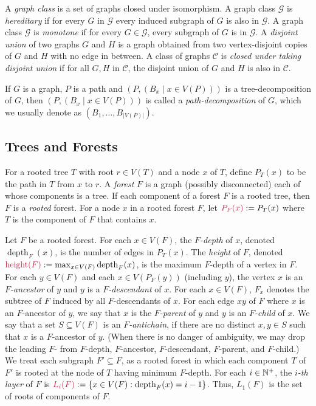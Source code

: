 \documentclass{patmorin}
\makeatletter
\newcommand{\defin}[1]{\emph{\textcolor{brightmaroon}{#1}}}
\def\mathcolor#1#{\@mathcolor{#1}}
\def\@mathcolor#1#2#3{%
  \protect\leavevmode
  \begingroup
    \color#1{#2}#3%
  \endgroup
}
\newcommand{\mathdefin}[1]{\mathcolor{brightmaroon}{#1}}
\DeclareMathOperator{\height}{height}
\DeclareMathOperator{\depth}{depth}
\makeatother
\begin{document}
A \defin{graph class} is a set of graphs closed under isomorphism. A graph class  $\mathcal{G}$ is \defin{hereditary} if for every $G$ in $\mathcal{G}$ every induced subgraph of $G$ is also in $\mathcal{G}$. A  graph class $\mathcal{G}$ is \defin{monotone} if for every $G\in\mathcal{G}$, every subgraph of $G$ is in $\mathcal{G}$. 
 A \defin{disjoint union} of two graphs $G$ and $H$ is a graph obtained from two vertex-disjoint copies of $G$ and $H$ with no edge in between. A class of graphs $\mathcal{C}$ is \defin{closed under taking disjoint union} if for all $G,H$ in $\mathcal{C}$, the disjoint union of $G$ and $H$ is also in $\mathcal{C}$.

If $G$ is a graph, $P$ is a path and $(P,(B_x\mid x \in V(P)))$ is a tree-decomposition of $G$, then $(P,(B_x\mid x \in V(P)))$ is called a \defin{path-decomposition} of $G$, which we usually denote as $(B_1,\ldots,B_{|V(P)|})$.

\subsection{Trees and Forests}

For a rooted tree $T$ with root $r\in V(T)$ and a node $x$ of $T$, define \defin{$P_T(x)$} to be the path in $T$ from $x$ to $r$.    A \defin{forest} $F$ is a graph (possibly disconnected) each of whose components is a tree.  If each component of a forest $F$ is a rooted tree, then $F$ is a \defin{rooted} forest. For a node $x$ in a rooted forest $F$, let $\mathdefin{P_F(x)}:=P_T(x)$ where $T$ is the component of $F$ that contains $x$.

Let $F$ be a rooted forest.  For each $x\in V(F)$, the \defin{$F$-depth} of $x$, denoted \defin{$\depth_F(x)$}, is the number of edges in $P_T(x)$. The \defin{height} of $F$, denoted $\mathdefin{\height(F)}:=\max_{x\in V(F)}\depth_F(x)$, is the maximum $F$-depth of a vertex in $F$. For each $y\in V(F)$ and each $x\in V(P_F(y))$ (including $y$),  the vertex $x$ is an \defin{$F$-ancestor} of $y$ and $y$ is a \defin{$F$-descendant} of $x$.  For each $x\in V(F)$, \defin{$F_x$} denotes the subtree of $F$ induced by all $F$-descendants of $x$. For each edge $xy$ of $F$ where $x$ is an $F$-ancestor of $y$, we say that $x$ is the \defin{$F$-parent} of $y$ and $y$ is an \defin{$F$-child} of $x$. We say that a set $S\subseteq V(F)$ is an \defin{$F$-antichain}, if there are no distinct $x,y\in S$ such that $x$ is a $F$-ancestor of $y$.  (When there is no danger of ambiguity, we may drop the leading $F$- from $F$-depth, $F$-ancestor, $F$-descendant, $F$-parent, and $F$-child.) We treat each subgraph $F'\subseteq F$, as a rooted forest in which each component $T$ of $F'$ is rooted at the node of $T$ having minimum $F$-depth.  For each $i\in\mathbb{N}^+$, the \defin{$i$-th layer} of $F$ is $\mathdefin{L_i(F)}:=\{x\in V(F):\depth_F(x)=i-1\}$. Thus, $L_1(F)$ is the set of roots of components of $F$.
\end{document}
